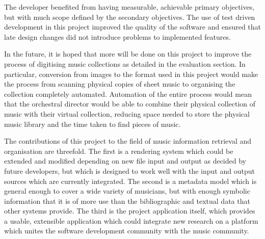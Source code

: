 The developer benefited from having measurable, achievable primary objectives, but with much scope defined by the secondary objectives. The use of test driven development in this project improved the quality of the software and ensured that late design changes did not introduce problems to implemented features.

In the future, it is hoped that more will be done on this project to improve the process of digitising music collections as detailed in the evaluation section. In particular, conversion from images to the format used in this project would make the process from scanning physical copies of sheet music to organising the collection completely automated. Automation of the entire process would mean that the orchestral director would be able to combine their physical collection of music with their virtual collection, reducing space needed to store the physical music library and the time taken to find pieces of music.

The contributions of this project to the field of music information retrieval and organisation are threefold. The first is a rendering system which could be extended and modified depending on new file input and output as decided by future developers, but which is designed to work well with the input and output sources which are currently integrated. The second is a metadata model which is general enough to cover a wide variety of musicians, but with enough symbolic information that it is of more use than the bibliographic and textual data that other systems provide. The third is the project application itself, which provides a usable, extensible application which could integrate new research on a platform which unites the software development community with the music community.